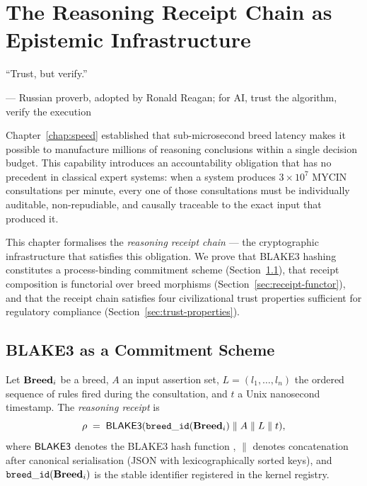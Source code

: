 
\chapter{The Reasoning Receipt Chain as Epistemic Infrastructure}
\label{chap:receipt}
\label{chap:civilizational}

\epigraph{%
  ``Trust, but verify.''
}{--- Russian proverb, adopted by Ronald Reagan; for AI, trust the algorithm, verify the execution}

Chapter~\ref{chap:speed} established that sub-microsecond breed latency makes it possible
to manufacture millions of reasoning conclusions within a single decision budget.  This
capability introduces an accountability obligation that has no precedent in classical expert
systems: when a system produces $3 \times 10^7$ MYCIN consultations per minute, every one
of those consultations must be individually auditable, non-repudiable, and causally traceable
to the exact input that produced it.

This chapter formalises the \emph{reasoning receipt chain} --- the cryptographic
infrastructure that satisfies this obligation.  We prove that BLAKE3 hashing constitutes
a process-binding commitment scheme (Section~\ref{sec:blake3-commitment}), that receipt
composition is functorial over breed morphisms
(Section~\ref{sec:receipt-functor}), and that the receipt chain satisfies four
civilizational trust properties sufficient for regulatory compliance
(Section~\ref{sec:trust-properties}).

\section{BLAKE3 as a Commitment Scheme}
\label{sec:blake3-commitment}

\begin{definition}
\label{def:reasoning-receipt}
Let $\mathbf{Breed}_i$ be a breed, $A$ an input assertion set, $L = (l_1, \ldots, l_n)$ the
ordered sequence of rules fired during the consultation, and $t$ a Unix nanosecond
timestamp.  The \emph{reasoning receipt} is
\[
  \rho \;=\; \mathsf{BLAKE3}(\mathtt{breed\_id}(\mathbf{Breed}_i) \;\|\; A \;\|\; L \;\|\; t),
\]
where $\mathsf{BLAKE3}$ denotes the BLAKE3 hash function \cite{blake3_2020}, $\|$ denotes
concatenation after canonical serialisation (JSON with lexicographically sorted keys),
and $\mathtt{breed\_id}(\mathbf{Breed}_i)$ is the stable identifier registered in the kernel registry.
\end{definition}

